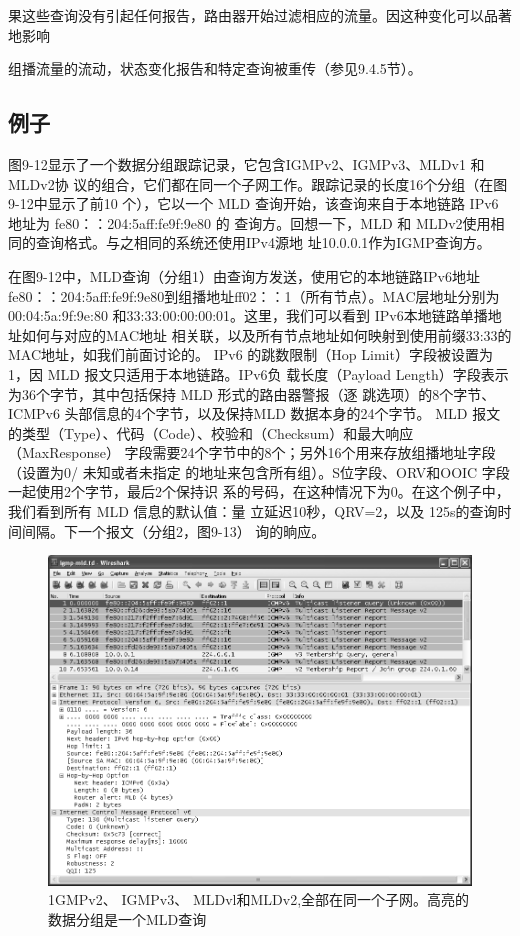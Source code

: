果这些查询没有引起任何报告，路由器开始过滤相应的流量。因这种变化可以品著地影响

组播流量的流动，状态变化报告和特定查询被重传（参见9.4.5节）。

\subsection{例子}
图9-12显示了一个数据分组跟踪记录，它包含IGMPv2、IGMPv3、MLDv1 和MLDv2协
议的组合，它们都在同一个子网工作。跟踪记录的长度16个分组（在图9-12中显示了前10
个），它以一个 MLD 查询开始，该查询来自于本地链路 IPv6 地址为 fe80：：204:5aff:fe9f:9e80 的
查询方。回想一下，MLD 和 MLDv2使用相同的查询格式。与之相同的系统还使用IPv4源地
址10.0.0.1作为IGMP查询方。

在图9-12中，MLD查询（分组1）由查询方发送，使用它的本地链路IPv6地址
fe80：：204:5aff:fe9f:9e80到组播地址ff02：：1（所有节点）。MAC层地址分别为00:04:5a:9f:9e:80
和33:33:00:00:00:01。这里，我们可以看到 IPv6本地链路单播地址如何与对应的MAC地址
相关联，以及所有节点地址如何映射到使用前缀33:33的MAC地址，如我们前面讨论的。
IPv6 的跳数限制（Hop Limit）字段被设置为1，因 MLD 报文只适用于本地链路。IPv6负
载长度（Payload Length）字段表示为36个字节，其中包括保持 MLD 形式的路由器警报（逐
跳选项）的8个字节、ICMPv6 头部信息的4个字节，以及保持MLD 数据本身的24个字节。
MLD 报文的类型（Type）、代码（Code）、校验和（Checksum）和最大响应（MaxResponse）
字段需要24个字节中的8个；另外16个用来存放组播地址字段（设置为0/ 未知或者未指定
的地址来包含所有组）。S位字段、ORV和OOIC 字段一起使用2个字节，最后2个保持识
系的号码，在这种情况下为0。在这个例子中，我们看到所有 MLD 信息的默认值：量
立延迟10秒，QRV=2，以及 125s的查询时间间隔。下一个报文（分组2，图9-13）
询的晌应。

\begin{figure}[ht]
    \centering
	\includegraphics[width=1.0\textwidth]{imgs/9/9-12.png}
	\caption{1GMPv2、 IGMPv3、 MLDvl和MLDv2,全部在同一个子网。高亮的数据分组是一个MLD查询}
\end{figure}

